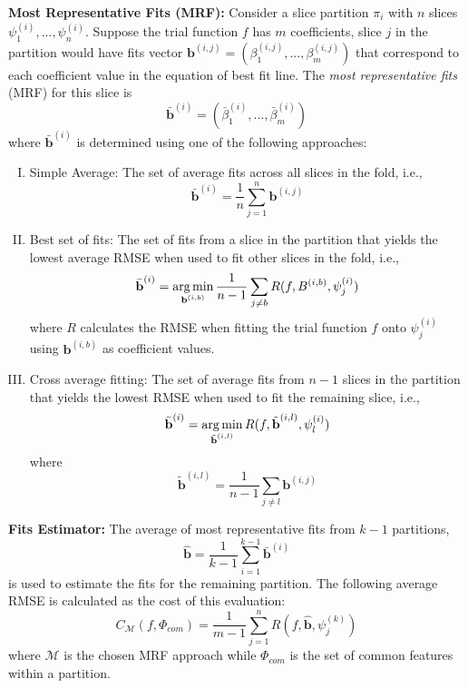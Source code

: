 \documentclass[11pt]{article}
\begin{document}
\textbf{Most Representative Fits (MRF):} 
Consider a slice partition $\pi_i$ with $n$ slices $\psi_1^{(i)}, ... ,\psi_n^{(i)}$. Suppose the trial function $f$ has $m$ coefficients, slice $j$ in the partition would have fits vector $\textbf{b}^{(i,j)} = (\beta_1^{(i,j)}, ..., \beta_m^{(i,j)})$ that correspond to each coefficient value in the equation of best fit line. The \textit{most representative fits} (MRF) for this slice is
$$
    \bar{\textbf{b}}^{(i)} = (\bar\beta_1^{(i)}, ..., \bar\beta_m^{(i)})
$$
where $\bar{\textbf{b}}^{(i)}$ is determined using one of the following approaches:
\begin{enumerate}[I.]
    \item Simple Average: The set of average fits across all slices in the fold, i.e.,
    $$
        \bar{\textbf{b}}^{(i)} = \frac{1}{n} \sum_{j=1}^{n} \textbf{b}^{(i,j)}
    $$
    \item Best set of fits: The set of fits from a slice in the partition that yields the lowest average RMSE when used to fit other slices in the fold, i.e., 
    $$
    \bar{\textbf{b}}^{(i)} = \operatorname*{arg\,min}_{\textbf{b}^{(i,b)}} \frac{1}{n-1}  \sum_{j \neq b} R(f, B^{(i,b)}, \psi_j^{(i)})
    $$
    where $R$ calculates the RMSE when fitting the trial function $f$ onto $\psi_j^{(i)}$ using $\textbf{b}^{(i,b)}$ as coefficient values.
    
    \item Cross average fitting: The set of average fits from $n-1$ slices in the partition that yields the lowest RMSE when used to fit the remaining slice, i.e., 
    $$
        \bar{\textbf{b}}^{(i)} = \operatorname*{arg\,min}_{\tilde{\textbf{b}}^{(i,l)}} R(f, \tilde{\textbf{b}}^{(i,l)}, \psi_l^{(i)})
    $$
    where
    $$
        \tilde{\textbf{b}}^{(i,l)} = \frac{1}{n-1} \sum_{j \neq l} \textbf{b}^{(i,j)}
    $$
\end{enumerate}

\textbf{Fits Estimator:}
The average of most representative fits from $k-1$ partitions,  
$$
    \hat{\textbf{b}} = \frac{1}{k-1} \sum_{i=1}^{k-1} \bar{\textbf{b}}^{(i)}
$$
is used to estimate the fits for the remaining partition. The following average RMSE is calculated as the cost of this evaluation:
$$
    C_{\mathcal{M}}(f, \Phi_{com}) = \frac{1}{m-1} \sum_{j=1}^{n} R(f, \hat{\textbf{b}}, \psi_{j}^{(k)})
$$
where $\mathcal{M}$ is the chosen MRF approach while $\Phi_{com}$ is the set of common features within a partition.
\end{document}
